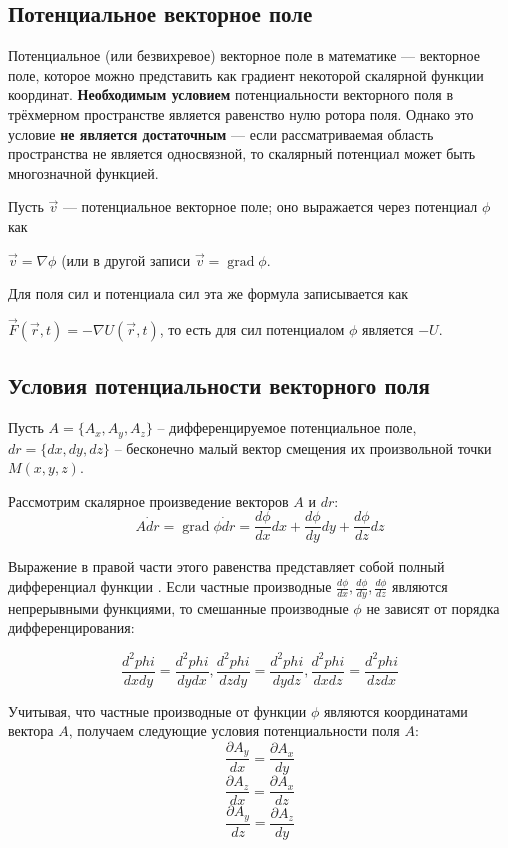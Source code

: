 \subsection{Потенциальное векторное поле}

Потенциальное (или безвихревое) векторное поле в математике — векторное поле, которое можно представить как градиент некоторой скалярной функции координат. \textbf{Необходимым условием} потенциальности векторного поля в трёхмерном пространстве является равенство нулю ротора поля. Однако это условие \textbf{не является достаточным} — если рассматриваемая область пространства не является односвязной, то скалярный потенциал может быть многозначной функцией.

Пусть $\vec {v}$ — потенциальное векторное поле; оно выражается через потенциал $\phi$  как

$\vec  v=\nabla \phi$  (или в другой записи $\vec {v}=\operatorname {grad} \phi $.

Для поля сил и потенциала сил эта же формула записывается как

${\vec  F}({\vec  r},t)=-\nabla U({\vec  r},t)$,
то есть для сил потенциалом $\phi$  является $-U$.

\subsection{Условия потенциальности векторного поля}

Пусть $A = \{A_x, A_y, A_z\}$ – дифференцируемое потенциальное поле, $dr = \{dx,dy,dz\}$ – бесконечно малый вектор смещения их произвольной точки $M(x,y,z)$.

Рассмотрим скалярное произведение векторов  $A$  и  $dr$:
$$A\dot dr = \operatorname{grad} \phi \dot dr = \frac{d\phi}{dx}dx +\frac{d\phi}{dy}dy + \frac{d\phi}{dz}dz$$

Выражение в правой части этого равенства представляет собой полный дифференциал функции . Если частные производные $\frac{d\phi}{dx}, \frac{d\phi}{dy}, \frac{d\phi}{dz}$ являются непрерывными функциями, то смешанные производные $\phi$ не зависят от порядка дифференцирования:

$$\frac{d^2phi}{dxdy} = \frac{d^2phi}{dydx},\frac{d^2phi}{dzdy} = \frac{d^2phi}{dydz}, \frac{d^2phi}{dxdz} = \frac{d^2phi}{dzdx} $$

Учитывая, что частные производные от функции $\phi$ являются координатами вектора $A$, получаем следующие условия потенциальности поля $A$:
$$\frac{\partial A_y}{dx} = \frac{\partial A_x}{dy}$$
$$\frac{\partial A_z}{dx} = \frac{\partial A_x}{dz}$$
$$\frac{\partial A_y}{dz} = \frac{\partial A_z}{dy}$$

